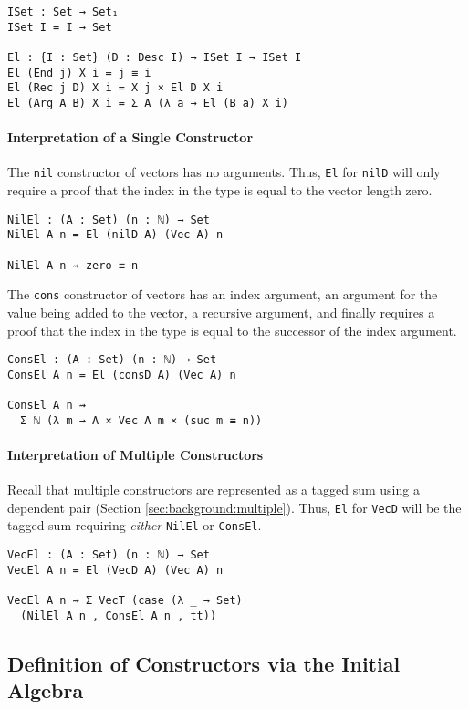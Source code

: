 \documentclass[preprint,nonatbib]{sigplanconf}
\newcommand{\refsec}[1]{Section \ref{sec:#1}}
\begin{document}
\begin{verbatim}
ISet : Set → Set₁
ISet I = I → Set

El : {I : Set} (D : Desc I) → ISet I → ISet I
El (End j) X i = j ≡ i
El (Rec j D) X i = X j × El D X i
El (Arg A B) X i = Σ A (λ a → El (B a) X i)
\end{verbatim}

\paragraph{Interpretation of a Single Constructor}

The {\tt nil} constructor of vectors has no arguments. Thus,
{\tt El} for {\tt nilD} will only require a proof that the index in
the type is equal to the vector length zero.

\begin{verbatim}
NilEl : (A : Set) (n : ℕ) → Set
NilEl A n = El (nilD A) (Vec A) n

NilEl A n ⇝ zero ≡ n
\end{verbatim}

The {\tt cons} constructor of vectors has an index argument, an
argument for the value being added to the vector, a recursive
argument, and finally requires a proof that the index in the type is
equal to the successor of the index argument.

\begin{verbatim}
ConsEl : (A : Set) (n : ℕ) → Set
ConsEl A n = El (consD A) (Vec A) n

ConsEl A n ⇝
  Σ ℕ (λ m → A × Vec A m × (suc m ≡ n))
\end{verbatim}

\paragraph{Interpretation of Multiple Constructors}

Recall that multiple constructors are represented as a tagged sum
using a dependent pair (\refsec{background:multiple}). Thus,
{\tt El} for {\tt VecD} will be the tagged sum requiring
{\it either} {\tt NilEl} or {\tt ConsEl}.

\begin{verbatim}
VecEl : (A : Set) (n : ℕ) → Set
VecEl A n = El (VecD A) (Vec A) n

VecEl A n ⇝ Σ VecT (case (λ _ → Set)
  (NilEl A n , ConsEl A n , tt))
\end{verbatim}

\subsection{Definition of Constructors via the Initial Algebra}
\label{sec:init:cons}
\end{document}
